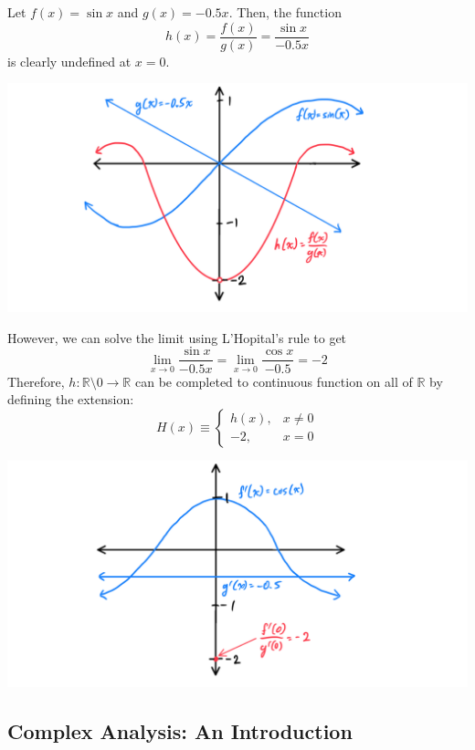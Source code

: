 \documentclass{article}
\begin{document}
    \begin{example}
      Let $f(x) = \sin{x}$ and $g(x) = -0.5x$. Then, the function 
      \[h(x) = \frac{f(x)}{g(x)} = \frac{\sin{x}}{-0.5x}\]
      is clearly undefined at $x = 0$. 
      \begin{center}
          \includegraphics[scale=0.25]{img/LHopital_Example_1.PNG}
      \end{center}
      However, we can solve the limit using L'Hopital's rule to get
      \[\lim_{x \rightarrow 0} \frac{\sin{x}}{-0.5x} = \lim_{x \rightarrow 0} \frac{\cos{x}}{-0.5} = -2\]
      Therefore, $h: \mathbb{R} \setminus 0 \longrightarrow \mathbb{R}$ can be completed to continuous function on all of $\mathbb{R}$ by defining the extension: 
      \[H(x) \equiv \begin{cases}
      h(x), & x \neq 0 \\
      -2, & x = 0
      \end{cases}\]
      \begin{center}
      \includegraphics[scale=0.25]{img/LHopital_Example_2.PNG}
      \end{center}
    \end{example}

  \subsection{Complex Analysis: An Introduction}
\end{document}
